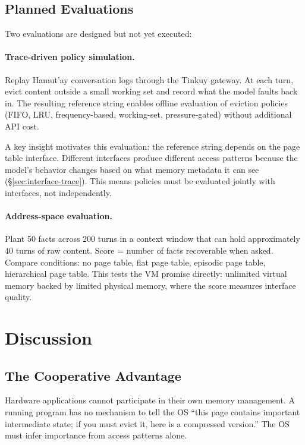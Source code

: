 \documentclass[sigplan,screen,anonymous]{acmart}
\begin{document}
\subsection{Planned Evaluations}

Two evaluations are designed but not yet executed:

\paragraph{Trace-driven policy simulation.} Replay Hamut'ay
conversation logs through the Tinkuy gateway. At each turn, evict
content outside a small working set and record what the model faults
back in. The resulting reference string enables offline evaluation of
eviction policies (FIFO, LRU, frequency-based, working-set,
pressure-gated) without additional API cost.

A key insight motivates this evaluation: the reference string depends
on the page table interface. Different interfaces produce different
access patterns because the model's behavior changes based on what
memory metadata it can see (\S\ref{sec:interface-trace}). This means
policies must be evaluated jointly with interfaces, not independently.

\paragraph{Address-space evaluation.} Plant 50 facts across 200
turns in a context window that can hold approximately 40 turns of
raw content. Score = number of facts recoverable when asked. Compare
conditions: no page table, flat page table, episodic page table,
hierarchical page table. This tests the VM promise directly:
unlimited virtual memory backed by limited physical memory, where the
score measures interface quality.


\section{Discussion}

\subsection{The Cooperative Advantage}

Hardware applications cannot participate in their own memory
management. A running program has no mechanism to tell the OS ``this
page contains important intermediate state; if you must evict it,
here is a compressed version.'' The OS must infer importance from
access patterns alone.
\end{document}
